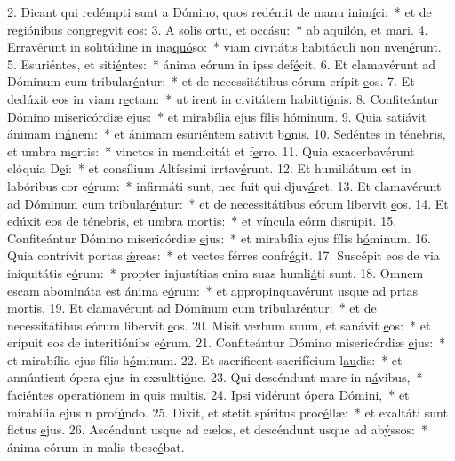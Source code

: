 2. Dicant qui redémpti sunt a Dómino, quos redémit de manu inim\uline{í}ci:~* et de regiónibus congregvit \uline{e}os:
3. A solis ortu, et occ\uline{á}su:~* ab aquilón, et m\uline{a}ri.
4. Erravérunt in solitúdine in ina\uline{quó}so:~* viam civitátis habitáculi non nven\uline{é}runt.
5. Esuriéntes, et siti\uline{é}ntes:~* ánima eórum in ipss def\uline{é}cit.
6. Et clamavérunt ad Dóminum cum tribular\uline{é}ntur:~* et de necessitátibus eórum erípit \uline{e}os.
7. Et dedúxit eos in viam r\uline{e}ctam:~* ut irent in civitátem habitti\uline{ó}nis.
8. Confiteántur Dómino misericórdiæ \uline{e}jus:~* et mirabília ejus fílis h\uline{ó}minum.
9. Quia satiávit ánimam in\uline{á}nem:~* et ánimam esuriéntem sativit b\uline{o}nis.
10. Sedéntes in ténebris, et umbra m\uline{o}rtis:~* vinctos in mendicitát et f\uline{e}rro.
11. Quia exacerbavérunt elóquia D\uline{e}i:~* et consílium Altíssimi irrtav\uline{é}runt.
12. Et humiliátum est in labóribus cor e\uline{ó}rum:~* infirmáti sunt, nec fuit qui djuv\uline{á}ret.
13. Et clamavérunt ad Dóminum cum tribular\uline{é}ntur:~* et de necessitátibus eórum libervit \uline{e}os.
14. Et edúxit eos de ténebris, et umbra m\uline{o}rtis:~* et víncula eórm disr\uline{ú}pit.
15. Confiteántur Dómino misericórdiæ \uline{e}jus:~* et mirabília ejus fílis h\uline{ó}minum.
16. Quia contrívit portas \uline{ǽ}reas:~* et vectes férres confr\uline{é}git.
17. Suscépit eos de via iniquitátis e\uline{ó}rum:~* propter injustítias enim suas humli\uline{á}ti sunt.
18. Omnem escam abomináta est ánima e\uline{ó}rum:~* et appropinquavérunt usque ad prtas m\uline{o}rtis.
19. Et clamavérunt ad Dóminum cum tribular\uline{é}ntur:~* et de necessitátibus eórum libervit \uline{e}os.
20. Misit verbum suum, et sanávit \uline{e}os:~* et erípuit eos de interitiónibs e\uline{ó}rum.
21. Confiteántur Dómino misericórdiæ \uline{e}jus:~* et mirabília ejus fílis h\uline{ó}minum.
22. Et sacríficent sacrifícium l\uline{au}dis:~* et annúntient ópera ejus in exsultti\uline{ó}ne.
23. Qui descéndunt mare in n\uline{á}vibus,~* faciéntes operatiónem in quis m\uline{u}ltis.
24. Ipsi vidérunt ópera D\uline{ó}mini,~* et mirabília ejus n prof\uline{ú}ndo.
25. Dixit, et stetit spíritus proc\uline{é}llæ:~* et exaltáti sunt flctus \uline{e}jus.
26. Ascéndunt usque ad cælos, et descéndunt usque ad ab\uline{ý}ssos:~* ánima eórum in malis tbesc\uline{é}bat.
